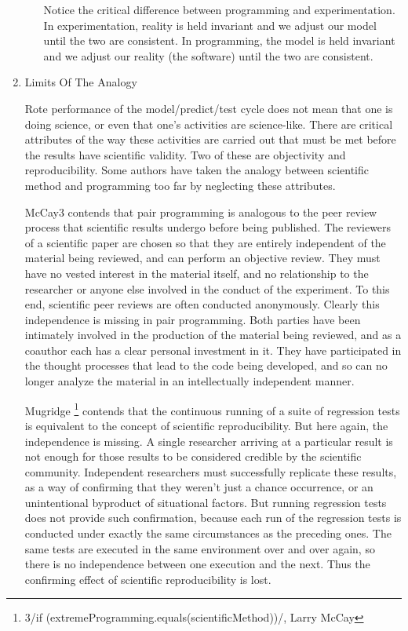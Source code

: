 \documentclass{article}
\begin{document}
\begin{enumerate}
\begin{enumerate}
Notice the critical difference between programming and experimentation.
In experimentation, reality is held invariant and we adjust our model
until the two are consistent. In programming, the model is held
invariant and we adjust our reality (the software) until the two are
consistent.
\end{enumerate}

\item Limits Of The Analogy
\label{sec:orgheadline398}

Rote performance of the model/predict/test cycle does not mean that one
is doing science, or even that one's activities are science-like. There
are critical attributes of the way these activities are carried out that
must be met before the results have scientific validity. Two of these
are objectivity and reproducibility. Some authors have taken the analogy
between scientific method and programming too far by neglecting these
attributes.

McCay3 contends that pair programming is analogous to the peer review
process that scientific results undergo before being published. The
reviewers of a scientific paper are chosen so that they are entirely
independent of the material being reviewed, and can perform an objective
review. They must have no vested interest in the material itself, and no
relationship to the researcher or anyone else involved in the conduct of
the experiment. To this end, scientific peer reviews are often conducted
anonymously. Clearly this independence is missing in pair programming.
Both parties have been intimately involved in the production of the
material being reviewed, and as a coauthor each has a clear personal
investment in it. They have participated in the thought processes that
lead to the code being developed, and so can no longer analyze the
material in an intellectually independent manner.

Mugridge \footnote{3/if (extremeProgramming.equals(scientificMethod))/, Larry McCay} contends that the continuous running of a suite of
regression tests is equivalent to the concept of scientific
reproducibility. But here again, the independence is missing. A single
researcher arriving at a particular result is not enough for those
results to be considered credible by the scientific community.
Independent researchers must successfully replicate these results, as a
way of confirming that they weren't just a chance occurrence, or an
unintentional byproduct of situational factors. But running regression
tests does not provide such confirmation, because each run of the
regression tests is conducted under exactly the same circumstances as
the preceding ones. The same tests are executed in the same environment
over and over again, so there is no independence between one execution
and the next. Thus the confirming effect of scientific reproducibility
is lost.


\end{enumerate}
\end{document}
